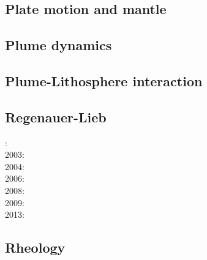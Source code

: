 \subsection*{Plate motion and mantle}

\noindent
\cite{zieg92a}
\cite{zhgm98}
\cite{lizh09}
\cite{huss12}
\cite{yoha15}

\subsection*{Plume dynamics}

\noindent
\cite{nasf94}\cite{hayu94}
\cite{lays99}
\cite{isst06}
\cite{toyu11}\cite{talz11}\cite{burk11}
\cite{dagm13}
\cite{daso15}
\cite{dacc18}

\subsection*{Plume-Lithosphere interaction}

\noindent
\cite{rich94}
\cite{zhgm96}
\cite{bugu05}
\cite{buge14}
\cite{gesb15}
\cite{fige16}

\subsection*{Regenauer-Lieb}

: \cite{reyu00}\\
2003: \cite{reyu03}\\
2004: \cite{reyu04}\\
2006: \cite{rehy06}\cite{rewr06}\\
2008: \cite{rerw08}\\
2009: \cite{reps09}\\
2013: \cite{revp13}

\subsection*{Rheology}

